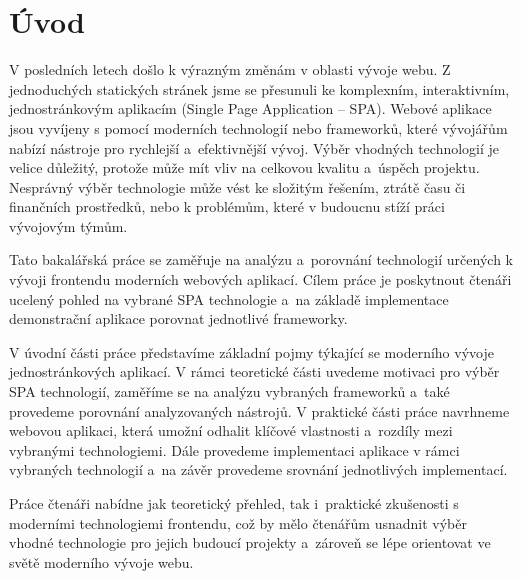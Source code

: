 \section*{Úvod}

V posledních letech došlo k výrazným změnám v oblasti vývoje webu. 
Z jednoduchých statických stránek jsme se přesunuli ke komplexním, interaktivním, jednostránkovým aplikacím (Single Page Application -- SPA). 
Webové aplikace jsou vyvíjeny s pomocí moderních technologií nebo frameworků, které vývojářům nabízí nástroje pro rychlejší a~efektivnější vývoj. 
Výběr vhodných technologií je velice důležitý, protože může mít vliv na celkovou kvalitu a~úspěch projektu. 
Nesprávný výběr technologie může vést ke složitým řešením, ztrátě času či finančních prostředků, nebo k problémům, které v budoucnu stíží práci vývojovým týmům.

Tato bakalářská práce se zaměřuje na analýzu a~porovnání technologií určených k vývoji frontendu moderních webových aplikací. 
Cílem práce je poskytnout čtenáři ucelený pohled na vybrané SPA technologie a~na základě implementace demonstrační aplikace porovnat jednotlivé frameworky.

V úvodní části práce představíme základní pojmy týkající se moderního vývoje jednostránkových aplikací. 
V rámci teoretické části uvedeme motivaci pro výběr SPA technologií, zaměříme se na analýzu vybraných frameworků a~také provedeme porovnání analyzovaných nástrojů. 
V praktické části práce navrhneme webovou aplikaci, která umožní odhalit klíčové vlastnosti a~rozdíly mezi vybranými technologiemi. 
Dále provedeme implementaci aplikace v rámci vybraných technologií a~na závěr provedeme srovnání jednotlivých implementací.

Práce čtenáři nabídne jak teoretický přehled, tak i~praktické zkušenosti s moderními technologiemi frontendu, 
což by mělo čtenářům usnadnit výběr vhodné technologie pro jejich budoucí projekty a~zároveň se lépe orientovat ve světě moderního vývoje webu.


